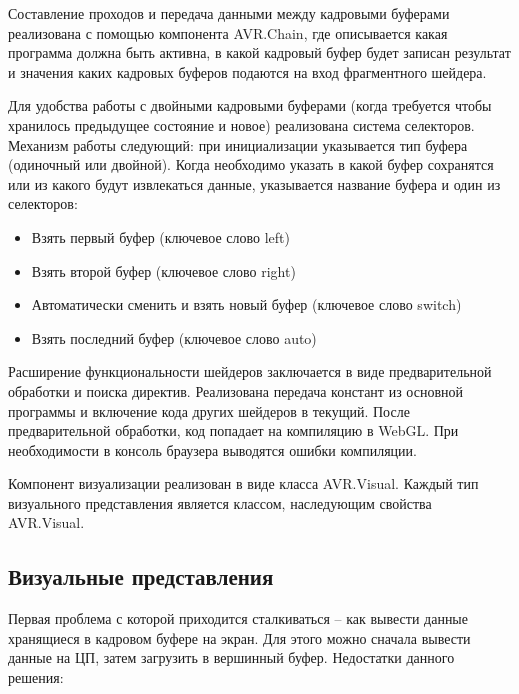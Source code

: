 Составление проходов и передача данными между кадровыми буферами реализована с помощью
компонента AVR.Chain, где описывается какая программа должна быть активна, в какой
кадровый буфер будет записан результат и значения каких кадровых буферов подаются на вход
фрагментного шейдера.

Для удобства работы с двойными кадровыми буферами (когда требуется чтобы хранилось предыдущее
состояние и новое) реализована система селекторов. Механизм работы следующий: при инициализации
указывается тип буфера (одиночный или двойной). Когда необходимо указать в какой буфер сохранятся 
или из какого будут извлекаться данные, указывается название буфера и один из селекторов:

\begin{itemize}
  \item Взять первый буфер (ключевое слово left)
  \item Взять второй буфер (ключевое слово right)
  \item Автоматически сменить и взять новый буфер (ключевое слово switch)
  \item Взять последний буфер (ключевое слово auto)
\end{itemize}

Расширение функциональности шейдеров заключается в виде предварительной обработки
и поиска директив. Реализована передача констант из основной программы и включение
кода других шейдеров в текущий. После предварительной обработки, код попадает на компиляцию
в WebGL. При необходимости в консоль браузера выводятся ошибки компиляции.

Компонент визуализации реализован в виде класса AVR.Visual. Каждый тип визуального представления
является классом, наследующим свойства AVR.Visual.

\subsection{Визуальные представления}


Первая проблема с которой приходится сталкиваться -- как вывести данные хранящиеся в кадровом
буфере на экран. Для этого можно сначала вывести данные на ЦП, затем загрузить в вершинный буфер.
Недостатки данного решения:

